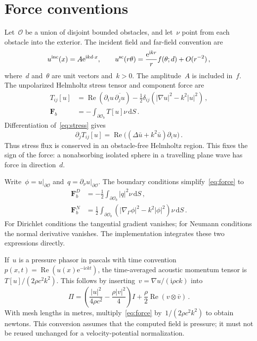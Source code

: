 \documentclass[11pt,a4paper]{article}
\numberwithin{equation}{section}
\newcommand{\dd}{\,\mathrm d}
\newcommand{\ii}{\mathrm i}
\newcommand{\Rea}{\operatorname{Re}}
\begin{document}
\section{Force conventions}
Let~$\mathcal O$ be a union of disjoint bounded obstacles, and let~$\nu$ point from each obstacle into the exterior. The incident field and far-field convention are
\begin{equation}\label{eq:field}
 u^{\rm inc}(x)=A\mathrm e^{\ii k d\cdot x},\qquad
 u^{\rm sc}(r\theta)=\frac{\mathrm e^{\ii kr}}r f(\theta;d)+O(r^{-2})\,,
\end{equation}
where~$d$ and~$\theta$ are unit vectors and~$k>0$. The amplitude~$A$ is included in~$f$. The unpolarized Helmholtz stress tensor and component force are
\begin{align}
 T_{ij}[u]&=\Rea(\partial_i u\,\overline{\partial_j u})
       -\tfrac12\delta_{ij}(|\nabla u|^2-k^2|u|^2)\,,\label{eq:stress}\\
 \mathbf F_b&=-\int_{\partial\mathcal O_b}T[u]\nu\dd S\,.\label{eq:force}
\end{align}
Differentiation of~\eqref{eq:stress} gives
\begin{equation}
 \partial_jT_{ij}[u]=\Rea\bigl((\Delta\bar u+k^2\bar u)\partial_i u\bigr)\,.
\end{equation}
Thus stress flux is conserved in an obstacle-free Helmholtz region. This fixes the sign of the force: a nonabsorbing isolated sphere in a travelling plane wave has force in direction~$d$.

Write~$\phi=u|_{\partial\mathcal O}$ and~$q=\partial_\nu u|_{\partial\mathcal O}$. The boundary conditions simplify~\eqref{eq:force} to
\begin{align}
 \mathbf F_b^{D}&=-\tfrac12\int_{\partial\mathcal O_b}|q|^2\nu\dd S\,,\label{eq:dirichlet}\\
 \mathbf F_b^{N}&=\tfrac12\int_{\partial\mathcal O_b}
       (|\nabla_\Gamma\phi|^2-k^2|\phi|^2)\nu\dd S\,.\label{eq:neumann}
\end{align}
For Dirichlet conditions the tangential gradient vanishes; for Neumann conditions the normal derivative vanishes. The implementation integrates these two expressions directly.

If~$u$ is a pressure phasor in pascals with time convention~$p(x,t)=\Rea(u(x)\mathrm e^{-\ii ck t})$, the time-averaged acoustic momentum tensor is~$T[u]/(2\rho c^2k^2)$. This follows by inserting~$v=\nabla u/(\ii\rho ck)$ into
\begin{equation}
 \Pi=\left(\frac{|u|^2}{4\rho c^2}-\frac{\rho|v|^2}{4}\right)I
       +\frac\rho2\Rea(v\otimes\bar v)\,.
\end{equation}
With mesh lengths in metres, multiply~\eqref{eq:force} by~$1/(2\rho c^2k^2)$ to obtain newtons. This conversion assumes that the computed field is pressure; it must not be reused unchanged for a velocity-potential normalization.
\end{document}
